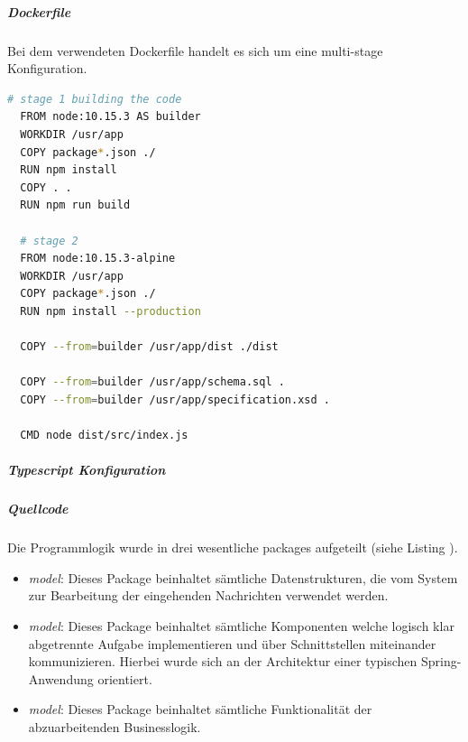 \subparagraph{Dockerfile}
Bei dem verwendeten Dockerfile handelt es sich um eine multi-stage Konfiguration. 

\begin{lstlisting}[language=bash]
  # stage 1 building the code
  FROM node:10.15.3 AS builder
  WORKDIR /usr/app
  COPY package*.json ./
  RUN npm install
  COPY . .
  RUN npm run build 
  
  # stage 2
  FROM node:10.15.3-alpine
  WORKDIR /usr/app
  COPY package*.json ./
  RUN npm install --production
  
  COPY --from=builder /usr/app/dist ./dist
  
  COPY --from=builder /usr/app/schema.sql .
  COPY --from=builder /usr/app/specification.xsd .
  
  CMD node dist/src/index.js
\end{lstlisting}

\subparagraph{Typescript Konfiguration}

\subparagraph{Quellcode}


Die Programmlogik wurde in drei wesentliche packages aufgeteilt (siehe Listing ). 

\begin{itemize}
  \item \emph{model}: Dieses Package beinhaltet sämtliche Datenstrukturen, die vom System zur Bearbeitung der eingehenden Nachrichten verwendet werden.
  \item \emph{model}: Dieses Package beinhaltet sämtliche Komponenten welche logisch klar abgetrennte Aufgabe implementieren und über Schnittstellen miteinander kommunizieren. Hierbei wurde sich an der Architektur einer typischen Spring-Anwendung orientiert.
  \item \emph{model}: Dieses Package beinhaltet sämtliche Funktionalität der abzuarbeitenden Businesslogik.
\end{itemize}





